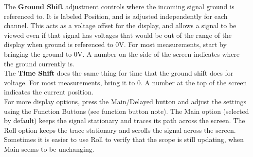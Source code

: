 \documentclass{article} %
\begin{document}
The {\bf Ground Shift} adjustment controls where the incoming signal ground is referenced to. It is labeled Position, and is adjusted independently for each channel. This acts as a voltage offset for the display, and allows a signal to be viewed even if that signal has voltages that would be out of the range of the display when ground is referenced to 0V. For most measurements, start by bringing the ground to 0V. A number on the side of the screen indicates where the ground currently is. \\

The {\bf Time Shift} does the same thing for time that the ground shift does for voltage. For most measurements, bring it to 0.  A number at the top of the screen indicates the current position. \\

For more display options, press the Main/Delayed button and adjust the settings using the Function Buttons (see function button note). The Main option (selected by default) keeps the signal stationary and traces its path across the screen. The Roll option keeps the trace stationary and scrolls the signal across the screen. Sometimes it is easier to use Roll to verify that the scope is still updating, when Main seems to be unchanging.
\end{document}
